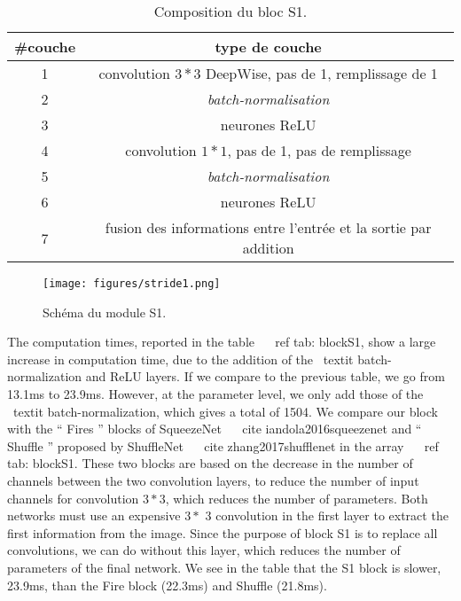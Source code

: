 \documentclass[letterpaper, 10 pt, conference]{ieeeconf}  %
\begin{document}
\begin{table}[!htb]
\centering
\begin{tabular}{|c|c|}
\hline
\#couche & type de couche \\
\hline
\hline
1 & convolution $3*3$ DeepWise, pas de 1, remplissage de 1 \\
\hline
2 & \textit{batch-normalisation}\\
\hline
3 & neurones ReLU\\
\hline
4 & convolution $1*1$, pas de 1, pas de remplissage\\
\hline
5 & \textit{batch-normalisation}\\
\hline
6 & neurones ReLU \\
\hline
7 & fusion des informations entre l'entrée et la sortie par addition\\
\hline

\end{tabular}
\caption{Composition du bloc S1.}
\label{tab:S1}
\end{table}



\begin{figure}%
\centering
\texttt{[image: figures/stride1.png]}%
\caption{Schéma du module S1.}%
\label{fig:S1}%
\end{figure}





The computation times, reported in the table ~ \ ref {tab: blockS1}, show a large increase in computation time, due to the addition of the \ textit {batch-normalization} and ReLU layers.
If we compare to the previous table, we go from 13.1ms to 23.9ms.
However, at the parameter level, we only add those of the \ textit {batch-normalization}, which gives a total of 1504.
We compare our block with the `` Fires '' blocks of SqueezeNet ~ \ cite {iandola2016squeezenet} and `` Shuffle '' proposed by ShuffleNet ~ \ cite {zhang2017shufflenet} in the array ~ \ ref {tab: blockS1}.
These two blocks are based on the decrease in the number of channels between the two convolution layers, to reduce the number of input channels for convolution $ 3 * 3 $, which reduces the number of parameters.
Both networks must use an expensive $ 3 * $ 3 convolution in the first layer to extract the first information from the image.
Since the purpose of block S1 is to replace all convolutions, we can do without this layer, which reduces the number of parameters of the final network.
We see in the table that the S1 block is slower, 23.9ms, than the Fire block (22.3ms) and Shuffle (21.8ms).
\end{document}
